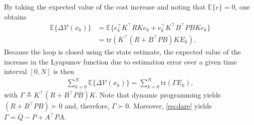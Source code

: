 \documentclass[letterpaper, 10 pt, conference]{ieeeconf}  %
\newcommand {\matr}[2]{\left[\begin{array}{#1}#2\end{array}\right]}
\newcommand{\E}{\mathbb{E}}
\begin{document}
By taking the expected value of the cost increase and noting that $\E\{e\}=0$, one obtains
\begin{align*}
	\E\{\Delta \mathcal{V}(x_k)\} &= \E\{e_k^\top K^\top RKe_k + e_k^\top K^\top B^\top PBKe_k\} \\
	&=  \mathrm{tr}\left ( K^\top\left ( R+B^\top PB\right )KE_k \right ).
\end{align*}
Because the loop is closed using the state estimate, the expected value of the increase in the Lyapunov function due to estimation error over a given time interval $[0,N]$ is then
\begin{align*}
	\sum_{k=0}^N \E\{\Delta \mathcal{V}(x_k)\} = \sum_{k=0}^N \mathrm{tr}\left ( \Gamma E_k \right ),
\end{align*}
with $\Gamma \triangleq K^\top\left ( R+B^\top PB\right )K$. Note that dynamic programming yields $\left ( R+B^\top PB\right ) \succ 0$ and, therefore, $\Gamma \succ 0$. Moreover, \eqref{eq:dare} yields $\Gamma = Q - P + A^\top P A$.
\end{document}
